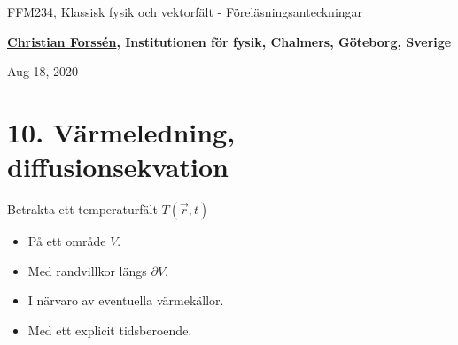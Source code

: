 \documentclass[%
oneside,                 %
final,                   %
10pt]{article}
\begin{document}

\newcommand{\exercisesection}[1]{\subsection*{#1}}







\thispagestyle{empty}

\begin{center}
{\LARGE\bf
\begin{spacing}{1.25}
FFM234, Klassisk fysik och vektorfält - Föreläsningsanteckningar
\end{spacing}
}
\end{center}


\begin{center}
{\bf \href{{http://fy.chalmers.se/subatom/tsp/}}{Christian Forssén}, Institutionen för fysik, Chalmers, Göteborg, Sverige${}^{}$} \\ [0mm]
\end{center}

\begin{center}
\end{center}
    

\begin{center}
Aug 18, 2020
\end{center}

\vspace{1cm}


\section*{10. Värmeledning, diffusionsekvation}

Betrakta ett temperaturfält $T(\vec{r},t)$
\begin{itemize}
\item På ett område $V$.

\item Med randvillkor längs $\partial V$.

\item I närvaro av eventuella värmekällor.

\item Med ett explicit tidsberoende.
\end{itemize}
\end{document}
